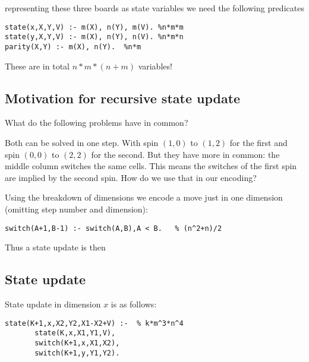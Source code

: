 \documentclass[]{llncs}
\newcommand{\spintable}[9]{ 
\node [matrix,ampersand replacement=\&,nodes={minimum size=4mm}]
{
    \node {#1}; \& \node{#2}; \& \node {#3}; \\ 
    \node {#4}; \& \node{#5}; \& \node {#6}; \\ 
    \node {#7}; \& \node{#8}; \& \node {#9}; \\ 
}; 
}
\begin{document}
representing these three boards as state variables we need the following predicates

\begin{verbatim} 
state(x,X,Y,V) :- m(X), n(Y), m(V). %n*m*m 
state(y,X,Y,V) :- m(X), n(Y), n(V). %n*m*n 
parity(X,Y) :- m(X), n(Y).  %n*m 
\end{verbatim}

These are in total $n*m*(n+m)$ variables!

\subsection{Motivation for recursive state update}

What do the following problems have in common? 


Both can be solved in one step. With spin $(1,0)$ to $(1,2)$ for the first and spin
$(0,0)$ to $(2,2)$ for the second.  But they have more in common: the middle column
switches the same cells. This means the switches of the first spin are implied by the
second spin. How do we use that in our encoding?

Using the breakdown of dimensions we encode a move just in one dimension (omitting
step number and dimension):

\begin{verbatim} 
switch(A+1,B-1) :- switch(A,B),A < B.   % (n^2+n)/2 
\end{verbatim}

Thus a state update is then 


\subsection{State update} State update in dimension $x$ is as follows:

\begin{verbatim} 
state(K+1,x,X2,Y2,X1-X2+V) :-  % k*m^3*n^4 
       state(K,x,X1,Y1,V),
       switch(K+1,x,X1,X2), 
       switch(K+1,y,Y1,Y2).  
\end{verbatim}
\end{document}
